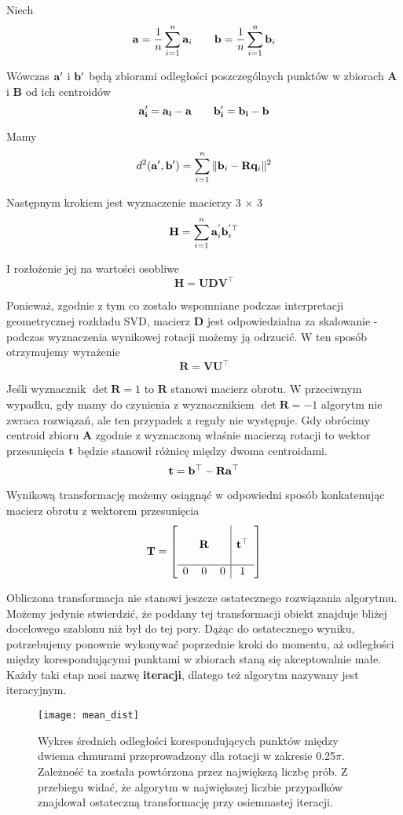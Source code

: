 \documentclass{article}
\begin{document}
Niech 
\[\vb{a} = \frac{1}{n} \sum_{i=1}^n \vb{a}_i \qquad \vb{b} = \frac{1}{n} \sum_{i=1}^n \vb{b}_i \]

Wówczas $\vb{a'}$ i $\vb{b'}$ będą zbiorami odległości poszczególnych punktów w zbiorach $\mathbf{A}$ i $\mathbf{B}$ od ich centroidów
\[\vb{a'_i = a_i - a \qquad b'_i = b_i - b} \]

Mamy
\[d^2(\vb{a'}, \vb{b'}) = \sum_{i=1}^n \| \vb{b}_{i} - \mathbf{R} \vb{q}_{i}\|^2 \]

Następnym krokiem jest wyznaczenie macierzy 3 $\times$ 3 
\[\mathbf{H} = \sum_{i=1}^n \vb{a}_i^{'} \vb{b}_{i}^{'\top} \]

I rozłożenie jej na wartości osobliwe
\[\mathbf{H = UDV^\top} \]

Ponieważ, zgodnie z tym co zostało wspomniane podczas interpretacji geometrycznej rozkładu SVD, macierz $\mathbf{D}$ jest odpowiedzialna za skalowanie - podczas wyznaczenia wynikowej rotacji możemy ją odrzucić. W ten sposób otrzymujemy wyrażenie
\[\mathbf{R = VU^\top} \]

Jeśli wyznacznik $\det \mathbf{R} = 1$ to  $\mathbf{R}$ stanowi macierz obrotu. W przeciwnym wypadku, gdy mamy do czynienia z wyznacznikiem $\det \mathbf{R}= -1$ algorytm nie zwraca rozwiązań, ale ten przypadek z reguły nie występuje. Gdy obrócimy centroid zbioru $\mathbf{A}$ zgodnie z wyznaczoną właśnie macierzą rotacji to wektor przesunięcia $\vb{t}$ będzie stanowił różnicę między dwoma centroidami.
\[\vb{t} = \vb{b}^\top - \mathbf{R} \vb{a}^\top \]

Wynikową transformację możemy osiągnąć w odpowiedni sposób konkatenując macierz obrotu z wektorem przesunięcia
\[\mathbf{T} = \left[
\begin{array}{ccc|c}
& & & \\
& \mathbf{R} & & \vb{t}^\top \\
& & & \\
\hline
0 & 0 & 0 & 1
\end{array}
\right]
\]

Obliczona transformacja nie stanowi jeszcze ostatecznego rozwiązania algorytmu. Możemy jedynie stwierdzić, że poddany tej transformacji obiekt znajduje bliżej docelowego szablonu niż był do tej pory. Dążąc do ostatecznego wyniku, potrzebujemy ponownie wykonywać poprzednie kroki do momentu, aż odległości między korespondującymi punktami w zbiorach staną się akceptowalnie małe. Każdy taki etap nosi nazwę \textbf{iteracji}, dlatego też algorytm nazywany jest iteracyjnym.

\begin{figure}[h]
\centering
\texttt{[image: mean\_dist]}
\caption{Wykres średnich odległości korespondujących punktów między dwiema chmurami przeprowadzony dla rotacji w zakresie 0.25$\pi$. Zależność ta została powtórzona przez największą liczbę prób. Z przebiegu widać, że algorytm w największej liczbie przypadków znajdował ostateczną transformację przy osiemnastej iteracji.}
\end{figure}
\end{document}
